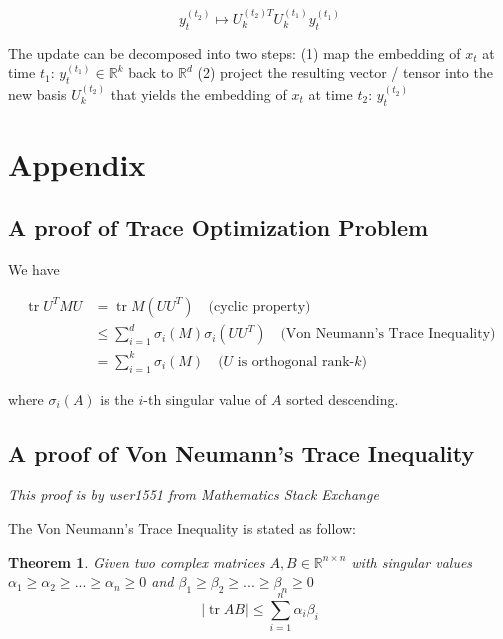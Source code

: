 \documentclass{article}
\DeclareMathOperator{\tr}{tr}
\newtheorem{theorem}{Theorem}
\begin{document}
\begin{equation}
    y_{t}^{(t_2)} \mapsto  U_k^{(t_2)T} U_k^{(t_1)} y_{t}^{(t_1)}
\end{equation}

The update can be decomposed into two steps: (1) map the embedding of $x_t$ at time $t_1$: $y_t^{(t_1)} \in \mathbb{R}^k$ back to $\mathbb{R}^d$ (2) project the resulting vector / tensor into the new basis $U_k^{(t_2)}$ that yields the embedding of $x_t$ at time $t_2$: $y_t^{(t_2)}$

\section{Appendix}
\subsection{A proof of Trace Optimization Problem}

We have 

\begin{equation}
\begin{split}
    \tr U^T M U &= \tr M (U U^T) \quad \text{(cyclic property)} \\ 
                &\leq \sum_{i=1}^d \sigma_i(M) \sigma_i(U U^T) \quad \text{(Von Neumann's Trace Inequality)} \\
                &= \sum_{i=1}^k \sigma_i(M) \quad \text{($U$ is orthogonal rank-$k$)}
\end{split}
\end{equation}

where $\sigma_i(A)$ is the $i$-th singular value of $A$ sorted descending.

\subsection{A proof of Von Neumann's Trace Inequality}

\emph{This proof is by user1551 from Mathematics Stack Exchange \cite{user1551}}

The Von Neumann's Trace Inequality is stated as follow:

\begin{theorem}
    Given two complex matrices $A, B \in \mathbb{R}^{n \times n}$ with singular values $\alpha_1 \geq \alpha_2 \geq ... \geq \alpha_n \geq 0$ and $\beta_1 \geq \beta_2 \geq ... \geq \beta_n \geq 0$
    \begin{equation}
        |\tr AB| \leq \sum_{i=1}^n \alpha_i \beta_i
    \end{equation}
\end{theorem}
\end{document}
